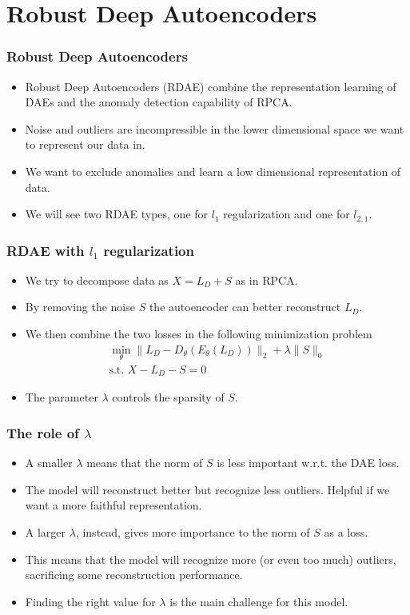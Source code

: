 \documentclass{beamer}
\theoremstyle{plain}
\theoremstyle{definition}
\theoremstyle{remark}
\newcommand{\norm}[1]{\lVert#1\rVert}
\begin{document}
\section{Robust Deep Autoencoders}

\begin{frame}
	\frametitle{Robust Deep Autoencoders}
	\begin{itemize}
		\item Robust Deep Autoencoders (RDAE) combine the representation learning of DAEs and the anomaly detection capability of RPCA.
		\item Noise and outliers are incompressible in the lower dimensional space we want to represent our data in.
		\item We want to exclude anomalies and learn a low dimensional representation of data.
		\item We will see two RDAE types, one for $l_1$ regularization and one for $l_{2,1}$.
	\end{itemize}
\end{frame}

\begin{frame}
	\frametitle{RDAE with $l_1$ regularization}
	\begin{itemize}
		\item We try to decompose data as $X=L_D+S$ as in RPCA.
		\item By removing the noise $S$ the autoencoder can better reconstruct $L_D$.
		\item We then combine the two losses in the following minimization problem
			\begin{align}
				\min_{\theta}{\norm{L_D -D_{\theta}(E_{\theta}(L_D))}_2 + \lambda\norm{S}_0}\\
				\text{s.t. }X-L_D-S=0  
			\end{align}
		\item The parameter $\lambda$ controls the sparsity of $S$.
	\end{itemize}
\end{frame}

\begin{frame}
	\frametitle{The role of $\lambda$}
	\begin{itemize}
		\item A smaller $\lambda$ means that the norm of $S$ is less important w.r.t. the DAE loss.
		\item The model will reconstruct better but recognize less outliers. Helpful if we want a more faithful representation.
		\item A larger $\lambda$, instead, gives more importance to the norm of $S$ as a loss.
		\item This means that the model will recognize more (or even too much) outliers, sacrificing some reconstruction performance.
		\item Finding the right value for $\lambda$ is the main challenge for this model.
	\end{itemize}
\end{frame}
\end{document}
